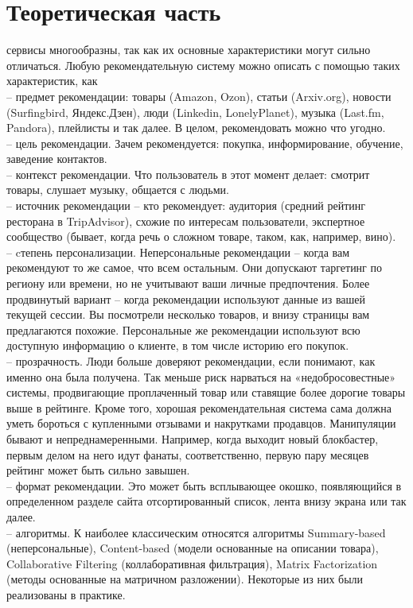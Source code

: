 \documentclass{article}
\newcommand\tab[1][1cm]{\hspace*{#1}}
\begin{document}
\section*{Теоретическая часть}
 сервисы многообразны, так как их основные характеристики могут сильно отличаться. Любую рекомендательную систему можно описать с помощью таких характеристик, как \\
\tab– предмет рекомендации: товары (Amazon, Ozon), статьи (Arxiv.org), новости (Surfingbird, Яндекс.Дзен), люди (Linkedin, LonelyPlanet), музыка (Last.fm, Pandora), плейлисты и так далее. В целом, рекомендовать можно что угодно. \\
\tab– цель рекомендации. Зачем рекомендуется: покупка, информирование, обучение, заведение контактов. \\
\tab– контекст рекомендации. Что пользователь в этот момент делает: смотрит товары, слушает музыку, общается с людьми. \\
\tab– источник рекомендации – кто рекомендует: аудитория (средний рейтинг ресторана в TripAdvisor), схожие по интересам пользователи, экспертное сообщество (бывает, когда речь о сложном товаре, таком, как, например, вино).\\
\tab– cтепень персонализации. Неперсональные рекомендации – когда вам рекомендуют то же самое, что всем остальным. Они допускают таргетинг по региону или времени, но не учитывают ваши личные предпочтения. Более продвинутый вариант – когда рекомендации используют данные из вашей текущей сессии. Вы посмотрели несколько товаров, и внизу страницы вам предлагаются похожие. Персональные же рекомендации используют всю доступную информацию о клиенте, в том числе историю его покупок.\\
\tab– прозрачность. Люди больше доверяют рекомендации, если понимают, как именно она была получена. Так меньше риск нарваться на «недобросовестные» системы, продвигающие проплаченный товар или ставящие более дорогие товары выше в рейтинге. Кроме того, хорошая рекомендательная система сама должна уметь бороться с купленными отзывами и накрутками продавцов. Манипуляции бывают и непреднамеренными. Например, когда выходит новый блокбастер, первым делом на него идут фанаты, соответственно, первую пару месяцев рейтинг может быть сильно завышен.\\
\tab– формат рекомендации. Это может быть всплывающее окошко, появляющийся в определенном разделе сайта отсортированный список, лента внизу экрана или так далее.\\
\tab– алгоритмы. К наиболее классическим относятся алгоритмы Summary-based (неперсональные), Content-based (модели основанные на описании товара), Collaborative Filtering (коллаборативная фильтрация), Matrix Factorization (методы основанные на матричном разложении). Некоторые из них были реализованы в практике.
\newpage
\end{document}
